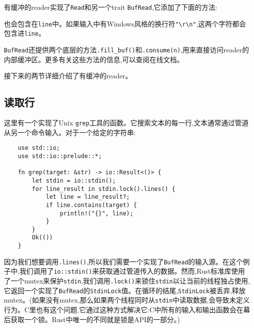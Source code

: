 有缓冲的reader实现了\texttt{Read}和另一个trait \texttt{BufRead},它添加了下面的方法:

也会包含在\texttt{line}中。如果输入中有Windows风格的换行符\texttt{"\textbackslash{}r\textbackslash{}n"},这两个字符都会包含进\texttt{line}。



\texttt{BufRead}还提供两个底层的方法\texttt{.fill\_buf()}和\texttt{.consume(n)},用来直接访问reader的内部缓冲区。更多有关这些方法的信息,可以查阅在线文档。

接下来的两节详细介绍了有缓冲的reader。

\subsection{读取行}\label{ReadLines}
这里有一个实现了Unix \texttt{grep}工具的函数。它搜索文本的每一行,文本通常通过管道从另一个命令输入。对于一个给定的字符串:
\begin{verbatim}
    use std::io;
    use std::io::prelude::*;

    fn grep(target: &str) -> io::Result<()> {
        let stdin = io::stdin();
        for line_result in stdin.lock().lines() {
            let line = line_result?;
            if line.contains(target) {
                println!("{}", line);
            }
        }
        Ok(())
    }
\end{verbatim}

因为我们想要调用\texttt{.lines()},所以我们需要一个实现了\texttt{BufRead}的输入源。在这个例子中,我们调用了\texttt{io::stdin()}来获取通过管道传入的数据。然而,Rust标准库使用了一个mutex来保护\texttt{stdin},我们调用\texttt{.lock()}来锁住\texttt{stdin}以让当前的线程独占使用,它返回一个实现了\texttt{BufRead}的\texttt{StdinLock}值。在循环的结尾,\texttt{StdinLock}被丢弃,释放mutex。(如果没有mutex,那么如果两个线程同时从\texttt{stdin}中读取数据,会导致未定义行为。C里也有这个问题,它通过这种方式解决它:C中所有的输入和输出函数会在幕后获取一个锁。Rust中唯一的不同就是锁是API的一部分。)

